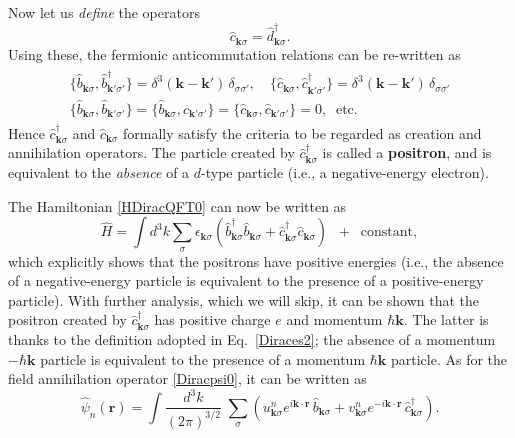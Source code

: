 \documentclass[pra,12pt]{revtex4}
\begin{document}
Now let us \textit{define} the operators
\begin{equation}
  \hat{c}_{\mathbf{k}\sigma} = \hat{d}^\dagger_{\mathbf{k}\sigma}.
\end{equation}
Using these, the fermionic anticommutation relations can be re-written as
\begin{align}
  \begin{aligned}
    \{\hat{b}_{\mathbf{k}\sigma}, \hat{b}_{\mathbf{k}'\sigma'}^\dagger \}
    = \delta^3(\mathbf{k}-\mathbf{k}') \, \delta_{\sigma\sigma'}, \quad
    \{\hat{c}_{\mathbf{k}\sigma}, \hat{c}_{\mathbf{k}'\sigma'}^\dagger \}
    = \delta^3(\mathbf{k}-\mathbf{k}') \, \delta_{\sigma\sigma'} \\
    \{\hat{b}_{\mathbf{k}\sigma}, \hat{b}_{\mathbf{k}'\sigma'} \} = 
    \{\hat{b}_{\mathbf{k}\sigma}, \hat{c}_{\mathbf{k}'\sigma'} \} = 
    \{\hat{c}_{\mathbf{k}\sigma}, \hat{c}_{\mathbf{k}'\sigma'} \} = 0, \;\;\textrm{etc.}
  \end{aligned}
  \label{Diracanticommutators}
\end{align}
Hence $\hat{c}^\dagger_{\mathbf{k}\sigma}$ and
$\hat{c}_{\mathbf{k}\sigma}$ formally satisfy the criteria to be
regarded as creation and annihilation operators.  The particle created
by $\hat{c}^\dagger_{\mathbf{k}\sigma}$ is called a \textbf{positron},
and is equivalent to the \textit{absence} of a $d$-type particle
(i.e., a negative-energy electron).

The Hamiltonian \eqref{HDiracQFT0} can now be written as
\begin{equation}
  \hat{H} = \int d^3k \sum_\sigma \epsilon_{\mathbf{k}\sigma} \left(
  \hat{b}^\dagger_{\mathbf{k}\sigma} \hat{b}_{\mathbf{k}\sigma}
  + \hat{c}^\dagger_{\mathbf{k}\sigma} \hat{c}_{\mathbf{k}\sigma}
  \right) \;\; + \;\; \textrm{constant},
  \label{HDiracQFT}
\end{equation}
which explicitly shows that the positrons have positive energies
(i.e., the absence of a negative-energy particle is equivalent to the
presence of a positive-energy particle).  With further analysis, which
we will skip, it can be shown that the positron created by
$\hat{c}^\dagger_{\mathbf{k}\sigma}$ has positive charge $e$ and
momentum $\hbar\mathbf{k}$.  The latter is thanks to the definition
adopted in Eq.~\eqref{Diraces2}; the absence of a momentum $-\hbar
\mathbf{k}$ particle is equivalent to the presence of a momentum
$\hbar \mathbf{k}$ particle.  As for the field annihilation operator
\eqref{Diracpsi0}, it can be written as
\begin{equation}
  \hat{\psi}_n(\mathbf{r})
  = \int \frac{d^3k}{(2\pi)^{3/2}} \; \sum_\sigma
  \left(
  u^n_{\mathbf{k}\sigma} e^{i\mathbf{k}\cdot\mathbf{r}} \, \hat{b}_{\mathbf{k}\sigma}
  + v^n_{\mathbf{k}\sigma} e^{-i\mathbf{k}\cdot\mathbf{r}} \,
  \hat{c}^\dagger_{\mathbf{k}\sigma}\right).
  \label{Diracpsi}
\end{equation}
\end{document}
